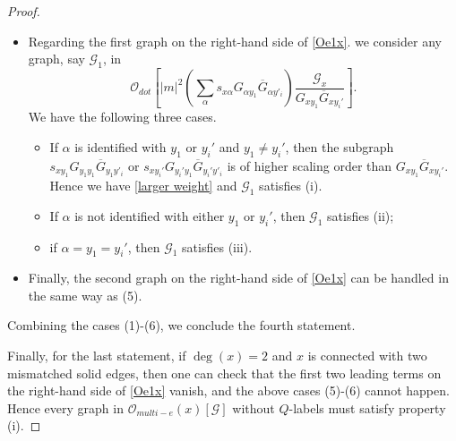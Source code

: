\documentclass{article}
\newcommand{\1}{\mathds{1}}
\numberwithin{equation}{section}
\newcommand{\al}{\alpha}
\renewcommand{\cal}{\mathcal}
\theoremstyle{plain} %
\theoremstyle{remark}
\begin{document}
\begin{proof}
\begin{itemize}
\begin{itemize}
\item If $\al$ is not identified with any other atom, then $G_{\al y_1}$ is of scaling order 1. Moreover, suppose $\cal G_1$ contains a graph in $\partial_{\overline h_{x\al}} f_x(G)$ obtained by taking partial derivative as in \eqref{partialhG}. By our assumption on $f_x(G)$, we must have $a \ne x$ and $b\ne x$, or $a=b=x$. In both cases, the scaling order of $G_{a\al}G_{xb}$ or $\overline G_{bx}\overline G_{\al a}$ is strictly larger than the original component $G_{ab}$ or $\overline G_{ba}$. Hence we have \eqref{larger weight} and $\cal G_1$ satisfies (i).
\end{itemize}

\item[(5)] Regarding the first graph on the right-hand side of \eqref{Oe1x}. we consider any graph, say $\cal G_1$, in $$\cal O_{dot}\left[|m|^2  \left( \sum_\al s_{x\al }G_{\al y_1} \overline G_{\al y'_i}\right)\frac{\cal G_x}{G_{x y_1} \overline G_{xy_i'}} \right].$$
We have the following three cases.
\begin{itemize}
\item If $\al$ is identified with $y_1$ or $y_i'$ and $y_1\ne y_i'$, then the subgraph $s_{xy_1}G_{y_1 y_1} \overline G_{y_1 y'_i}$ or $s_{xy_i'}G_{y_i' y_1} \overline G_{y_i' y'_i}$ is of higher scaling order than $G_{x y_1} \overline G_{xy_i'}$. Hence we have \eqref{larger weight} and $\cal G_1$ satisfies (i).

\item If $\al$ is not identified with either $y_1$ or $y_i'$, then $\cal G_1$ satisfies (ii); 

\item if $\al=y_1=y_i'$, then $\cal G_1$ satisfies (iii). 
\end{itemize}
\item[(6)] Finally, the second graph on the right-hand side of \eqref{Oe1x} can be handled in the same way as (5). 
\end{itemize}
Combining the cases (1)-(6), we conclude the fourth statement. 

Finally, for the last statement, if $\deg(x)=2$ and $x$ is connected with two mismatched solid edges, then one can check that the first two leading terms on the right-hand side of \eqref{Oe1x} vanish, and the above cases (5)-(6) cannot happen. Hence every graph in ${\cal O}_{multi-e}(x)[\cal G]$ without $Q$-labels must satisfy property (i).
  \end{proof} 
\end{document}
